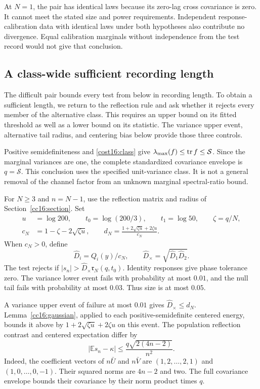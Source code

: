 At $N=1$, the pair has identical laws because its zero-lag cross covariance is zero. It cannot meet the stated size and power requirements. Independent response-calibration data with identical laws under both hypotheses also contribute no divergence. Equal calibration marginals without independence from the test record would not give that conclusion.

\subsection{A class-wide sufficient recording length}

The difficult pair bounds every test from below in recording length. To obtain a sufficient length, we return to the reflection rule and ask whether it rejects every member of the alternative class. This requires an upper bound on its fitted threshold as well as a lower bound on its statistic. The variance upper event, alternative tail radius, and centering bias below provide those three controls.

Positive semidefiniteness and \eqref{cost16:class} give
$\lambda_{\max}(f)\le\operatorname{tr} f\le\mathcal S$. Since the marginal variances are one, the complete standardized covariance envelope is $q=\mathcal S$. This conclusion uses the specified unit-variance class. It is not a general removal of the channel factor from an unknown marginal spectral-ratio bound.

For $N\ge3$ and $n=N-1$, use the reflection matrix and radius of Section~\ref{cc16:section}. Set
\begin{align}
 u&=\log200,\qquad t_0=\log(200/3),\qquad t_1=\log50,
 \qquad \zeta=q/N,\nonumber\\
 c_N&=1-\zeta-2\sqrt{\zeta u},\qquad
 d_N=\frac{1+2\sqrt{\zeta u}+2\zeta u}{c_N}.
 \label{cost16:scale}
\end{align}
When $c_N>0$, define
\[
 \widehat D_i=Q_i(y)/c_N,
 \qquad \widehat D_\times=\sqrt{\widehat D_1\widehat D_2}.
\]
The test rejects if $|s_n|>\widehat D_\times\mathfrak r_N(q,t_0)$. Identity responses give phase tolerance zero. The variance lower event fails with probability at most $0.01$, and the null tail fails with probability at most $0.03$. Thus size is at most $0.05$.

A variance upper event of failure at most $0.01$ gives $\widehat D_\times\le d_N$. Lemma~\ref{cc16:gaussian}, applied to each positive-semidefinite centered energy, bounds it above by $1+2\sqrt{\zeta u}+2\zeta u$ on this event. The population reflection contrast and centered expectation differ by
\begin{equation}
 |\mathbb E s_n-\kappa|
 \le\frac{q\sqrt{2(4n-2)}}{n^2}.
 \label{cost16:bias}
\end{equation}
Indeed, the coefficient vectors of $n\bar U$ and $n\bar V$ are $(1,2,\ldots,2,1)$ and $(1,0,\ldots,0,-1)$. Their squared norms are $4n-2$ and two. The full covariance envelope bounds their covariance by their norm product times $q$.

